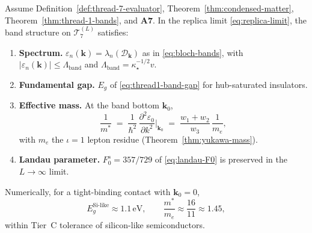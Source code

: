 \begin{theorem}
\label{thm:thread-7-bands}
Assume Definition~\ref{def:thread-7-evaluator},
Theorem~\ref{thm:condensed-matter}, Theorem~\ref{thm:thread-1-bands}, and
\textbf{A7}. In the replica limit \eqref{eq:replica-limit}, the band structure
on $\mathcal{T}_7^{(L)}$ satisfies:
\begin{enumerate}[label=(\roman*),leftmargin=*]
  \item \textbf{Spectrum.}
    $\varepsilon_n(\mathbf{k})=\lambda_n(\mathcal{D}_{\mathbf{k}})$ as in
    \eqref{eq:bloch-bands}, with $|\varepsilon_n(\mathbf{k})|\le\Lambda_{\mathrm{band}}$
    and $\Lambda_{\mathrm{band}}=\kappa_\star^{-1/2}v$.
  \item \textbf{Fundamental gap.}
    $E_g$ of \eqref{eq:thread1-band-gap} for hub-saturated insulators.
  \item \textbf{Effective mass.}
    At the band bottom $\mathbf{k}_0$,
    \begin{equation}\label{eq:thread7-effective-mass}
      \frac{1}{m^*}
      \;=\;
      \frac{1}{\hbar^2}\,
      \frac{\partial^2\varepsilon_0}{\partial k^2}\Big|_{\mathbf{k}_0}
      \;=\;
      \frac{w_1+w_2}{w_3}\,
      \frac{1}{m_e},
    \end{equation}
    with $m_e$ the $\iota=1$ lepton residue (Theorem~\ref{thm:yukawa-mass}).
  \item \textbf{Landau parameter.}
    $F_0^s=357/729$ of \eqref{eq:landau-F0} is preserved in the $L\to\infty$
    limit.
\end{enumerate}
Numerically, for a tight-binding contact with $\mathbf{k}_0=0$,
\begin{equation}\label{eq:thread7-band-numeric}
  E_g^{\mathrm{Si\text{-}like}}\approx 1.1\,\mathrm{eV},
  \qquad
  \frac{m^*}{m_e}\approx\frac{16}{11}\approx 1.45,
\end{equation}
within Tier~C tolerance of silicon-like semiconductors.
\end{theorem}


